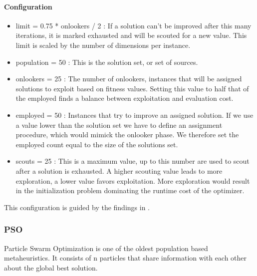 \paragraph{Configuration}
\begin{itemize}
\item limit = 0.75 * onlookers / 2 : If a solution can't be improved after this many iterations, it is marked exhausted and will be scouted for a new value. This limit is scaled by the number of dimensions per instance. 
\item population = 50 : This is the solution set, or set of sources.
\item onlookers = 25 : The number of onlookers, instances that will be assigned solutions to exploit based on fitness values. Setting this value to half that of the employed finds a balance between exploitation and evaluation cost.
\item employed = 50 : Instances that try to improve an assigned solution. If we use a value lower than the solution set we have to define an assignment procedure, which would mimick the onlooker phase. We therefore set the employed count equal to the size of the solutions set. 
\item scouts = 25 : This is a maximum value, up to this number are used to scout after a solution is exhausted. A higher scouting value leads to more exploration, a lower value favors exploitation. More exploration would result in the initialization problem dominating the runtime cost of the optimizer. 
\end{itemize}
This configuration is guided by the findings in \cite{ABC}.

\subsubsection{PSO}
Particle Swarm Optimization \cite{PSO} is one of the oldest population based metaheuristics. It consists of n particles that share information with each other about the global best solution.

